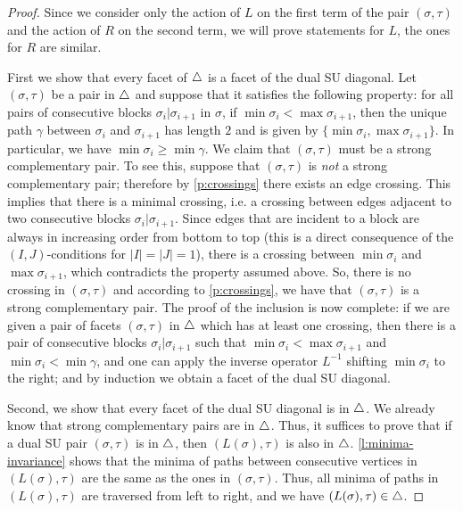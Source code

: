 \begin{proof}
Since we consider only the action of $L$ on the first term of the pair $(\sigma,\tau)$ and the action of $R$ on the second term, we will prove statements for $L$, the ones for $R$ are similar.

First we show that every facet of $\triangle$ is a facet of the dual SU diagonal. 
Let $(\sigma,\tau)$ be a pair in $\triangle$ and suppose that it satisfies the following property: for all pairs of consecutive blocks $\sigma_i | \sigma_{i+1}$ in $\sigma$, if $\min \sigma_i < \max \sigma_{i+1}$, then the unique path $\gamma$ between $\sigma_i$ and $\sigma_{i+1}$ has length $2$ and is given by $\{\min \sigma_i, \max \sigma_{i+1}\}$. 
In particular, we have $\min \sigma_i \geq \min \gamma$. 
We claim that $(\sigma,\tau)$ must be a strong complementary pair. 
To see this, suppose that $(\sigma,\tau)$ is \emph{not} a strong complementary pair; therefore by \cref{p:crossings} there exists an edge crossing. 
This implies that there is a minimal crossing, i.e. a crossing between edges adjacent to two consecutive blocks $\sigma_i | \sigma_{i+1}$. 
Since edges that are incident to a block are always in increasing order from bottom to top (this is a direct consequence of the $(I,J)$-conditions for $|I|=|J|=1$), there is a crossing between $\min \sigma_i$ and $\max \sigma_{i+1}$, which contradicts the property assumed above. 
So, there is no crossing in $(\sigma,\tau)$ and according to \cref{p:crossings}, we have that $(\sigma,\tau)$ is a strong complementary pair. 
The proof of the inclusion is now complete: if we are given a pair of facets $(\sigma,\tau)$ in $\triangle$ which has at least one crossing, then there is a pair of consecutive blocks $\sigma_i | \sigma_{i+1}$ such that $\min \sigma_i < \max \sigma_{i+1}$ and $\min \sigma_i < \min \gamma$, and one can apply the inverse operator $L^{-1}$ shifting $\min \sigma_i$ to the right; and by induction we obtain a facet of the dual SU diagonal. 

Second, we show that every facet of the dual SU diagonal is in $\triangle$. 
We already know that strong complementary pairs are in $\triangle$. 
Thus, it suffices to prove that if a dual SU pair $(\sigma,\tau)$ is in $\triangle$, then $(L(\sigma),\tau)$ is also in $\triangle$. 
\cref{l:minima-invariance} shows that the minima of paths between consecutive vertices in $(L(\sigma),\tau)$ are the same as the ones in $(\sigma,\tau)$. 
Thus, all minima of paths in $(L(\sigma), \tau)$ are traversed from left to right, and we have $(L(\sigma), \tau) \in \triangle$.
\end{proof}


